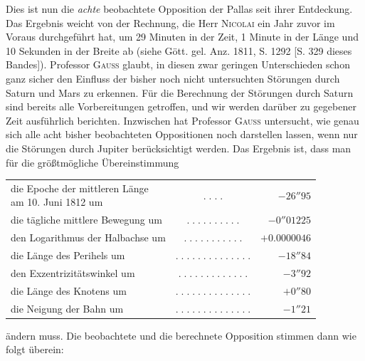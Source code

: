 \par\indent Dies ist nun die \emph{achte} beobachtete Opposition der Pallas seit ihrer Entdeckung. Das Ergebnis weicht von der Rechnung, die Herr \textsc{Nicolai} ein Jahr zuvor im Voraus durchgeführt hat, um 29 Minuten in der Zeit, 1 Minute in der Länge und 10 Sekunden in der Breite ab (siehe Gött. gel. Anz. 1811, S. 1292 [S. 329 dieses Bandes]). Professor \textsc{Gauss} glaubt, in diesen zwar geringen Unterschieden schon ganz sicher den Einfluss der bisher noch nicht untersuchten Störungen durch Saturn und Mars zu erkennen. Für die Berechnung der Störungen durch Saturn sind bereits alle Vorbereitungen getroffen, und wir werden darüber zu gegebener Zeit ausführlich berichten. Inzwischen hat Professor \textsc{Gauss} untersucht, wie genau sich alle acht bisher beobachteten Oppositionen noch darstellen lassen, wenn nur die Störungen durch Jupiter berücksichtigt werden. Das Ergebnis ist, dass man für die größtmögliche Übereinstimmung

\begin{center}\fontsize{9}{11}\selectfont\setlength{\tabcolsep}{2pt}\renewcommand{\arraystretch}{1.15}\begin{tabular}{lcr}
\shortstack[l]{die Epoche der mittleren Länge\\am 10. Juni 1812 um} & $.\;.\;.\;.$ & $-26''95$\\
die tägliche mittlere Bewegung um & $.\;.\;.\;.\;.\;.\;.\;.\;.\;.$ & $-0''01225$\\
den Logarithmus der Halbachse um & $.\;.\;.\;.\;.\;.\;.\;.\;.\;.\;.$ & $+0.0000046$\\
die Länge des Perihels um & $.\;.\;.\;.\;.\;.\;.\;.\;.\;.\;.\;.\;.\;.$ & $-18''84$\\
den Exzentrizitätswinkel um & $.\;.\;.\;.\;.\;.\;.\;.\;.\;.\;.\;.\;.$ & $-3''92$\\
die Länge des Knotens um & $.\;.\;.\;.\;.\;.\;.\;.\;.\;.\;.\;.\;.\;.$ & $+0''80$\\
die Neigung der Bahn um & $.\;.\;.\;.\;.\;.\;.\;.\;.\;.\;.\;.\;.\;.$ & $-1''21$\\
\end{tabular}\end{center}

\noindent ändern muss. Die beobachtete und die berechnete Opposition stimmen dann wie folgt überein:

